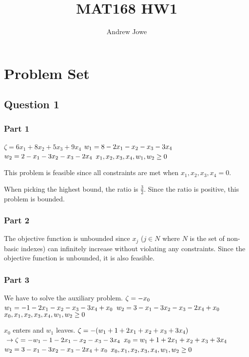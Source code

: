 \documentclass{article}
\title{MAT168 HW1}
\author{Andrew Jowe}
\begin{document}
\maketitle
\section*{Problem Set}
\subsection*{Question 1}
\subsubsection*{Part 1}
$\zeta = 6x_1 + 8x_2 + 5x_3 + 9x_4$
$\\ w_1 = 8 - 2x_1 - x_2 - x_3 - 3x_4$
$\\ w_2 = 2 - x_1 - 3x_2 - x_3 - 2x_4$
$\\ x_1, x_2, x_3, x_4, w_1, w_2 \geq 0$

This problem is feasible since all constraints are met when $x_1, x_2, x_3, x_4 = 0$.

When picking the highest bound, the ratio is $\frac{3}{2}$. Since the ratio is positive, this problem is bounded.

\subsubsection*{Part 2}
The objective function is unbounded since $x_j$ ($j \in N$ where $N$ is the set of non-basic indexes) can infinitely increase without violating any constraints. Since the objective function is unbounded, it is also feasible.

\subsubsection*{Part 3}
We have to solve the auxiliary problem.
$\\\zeta = -x_0$
$\\ w_1 = - 1 - 2x_1 - x_2 - x_3 - 3x_4 + x_0$
$\\ w_2 = 3 - x_1 - 3x_2 - x_3 - 2x_4 + x_0$
$\\ x_0, x_1, x_2, x_3, x_4, w_1, w_2 \geq 0$

$x_0$ enters and $w_1$ leaves.
$\\\zeta = -(w_1 + 1 + 2x_1 + x_2 + x_3 + 3x_4)$
$\\\to \zeta = -w_1 - 1 - 2x_1 - x_2 - x_3 - 3x_4$
$\\ x_0 = w_1 + 1 + 2x_1 + x_2 + x_3 + 3x_4$
$\\ w_2 = 3 - x_1 - 3x_2 - x_3 - 2x_4 + x_0$
$\\ x_0, x_1, x_2, x_3, x_4, w_1, w_2 \geq 0$
\end{document}
